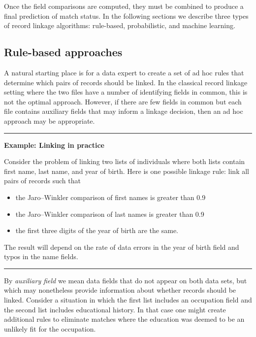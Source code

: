\documentclass[]{krantz}
\begin{document}
Once the field comparisons are computed, they must be combined to
produce a final prediction of match status. In the following sections we
describe three types of record linkage algorithms: rule-based,
probabilistic, and machine learning.

\subsection{Rule-based approaches}\label{rule-based-approaches}

A natural starting place is for a data expert to create a set of ad hoc
rules that determine which pairs of records should be linked. In the
classical record linkage setting where the two files have a number of
identifying fields in common, this is not the optimal approach. However,
if there are few fields in common but each file contains auxiliary
fields that may inform a linkage decision, then an ad hoc approach may
be appropriate.

\begin{center}\rule{0.5\linewidth}{\linethickness}\end{center}

\textbf{Example: Linking in practice}

Consider the problem of linking two lists of individuals where both
lists contain first name, last name, and year of birth. Here is one
possible linkage rule: link all pairs of records such that

\begin{itemize}
\item
  the Jaro--Winkler comparison of first names is greater than 0.9
\item
  the Jaro--Winkler comparison of last names is greater than 0.9
\item
  the first three digits of the year of birth are the same.
\end{itemize}

The result will depend on the rate of data errors in the year of birth
field and typos in the name fields.

\begin{center}\rule{0.5\linewidth}{\linethickness}\end{center}

By \emph{auxiliary field} we mean data fields that do not appear on both
data sets, but which may nonetheless provide information about whether
records should be linked. Consider a situation in which the first list
includes an occupation field and the second list includes educational
history. In that case one might create additional rules to eliminate
matches where the education was deemed to be an unlikely fit for the
occupation.
\end{document}
